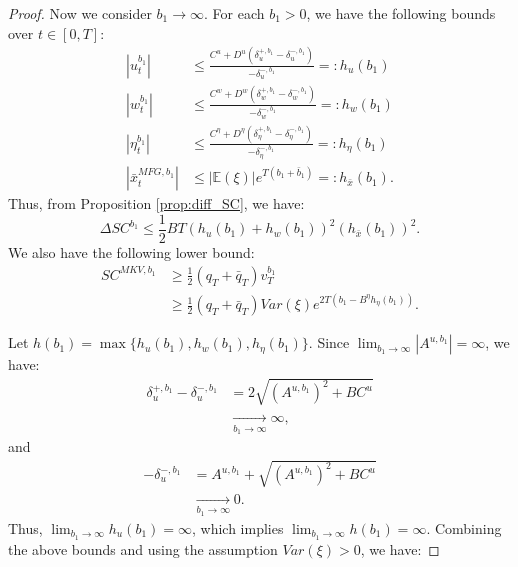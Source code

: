 \documentclass[11pt]{article}
\begin{document}
\begin{proof}
    Now we consider $b_1 \to \infty$. For each $b_1>0$, we have the following bounds over $t\in[0,T]$:
    \begin{equation*}
    \begin{split}
	    \left| u^{b_1}_t\right| &\leq \frac{C^u+D^u(\delta^{+,b_1}_u-\delta^{-,b_1}_u)}{-\delta^{-,b_1}_u}=:h_u(b_1) \\
		\left| w^{b_1}_t\right| &\leq \frac{C^w+D^w(\delta^{+,b_1}_w-\delta^{-,b_1}_w)}{-\delta^{-,b_1}_w}=:h_w(b_1) \\
		\left| \eta^{b_1}_t\right| &\leq \frac{C^{\eta}+D^{\eta}(\delta^{+,b_1}_{\eta}-\delta^{-,b_1}_{\eta})}{-\delta^{-,b_1}_{\eta}}=:h_{\eta}(b_1) \\
		\left| \bar{x}^{MFG,b_1}_t \right| &\leq \left| \mathbb{E}(\xi)\right| e^{T(b_1+\bar{b}_1)}=:h_{\bar{x}}(b_1).
    \end{split}
    \end{equation*}
    Thus, from Proposition \ref{prop:diff_SC}, we have:
    \begin{equation*}
	    \Delta SC^{b_1} \leq \frac{1}{2}BT(h_u(b_1)+h_w(b_1))^2 (h_{\bar{x}}(b_1))^2.
    \end{equation*}
    We also have the following lower bound:
    \begin{equation*}
	\begin{split}
	SC^{MKV,b_1} &\geq \frac{1}{2}(q_T+\bar{q}_T)v^{b_1}_T \\
	& \geq \frac{1}{2}(q_T+\bar{q}_T)Var(\xi)e^{2T(b_1-B^{\eta}h_{\eta}(b_1))}.
	\end{split}
    \end{equation*}
    
    Let $h(b_1)=\max \{h_u(b_1),h_w(b_1),h_{\eta}(b_1) \}$. Since $\lim_{b_1 \to \infty} |A^{u,b_1}|=\infty$, we have:
    \begin{equation*}
    \begin{split}
	    \delta^{+,b_1}_u-\delta^{-,b_1}_u&=2 \sqrt{(A^{u,b_1})^2+BC^u} \\
	    &\xrightarrow[b_1 \to \infty]{}\infty,
    \end{split}
    \end{equation*}
    and
    \begin{equation*}
    \begin{split}
    -\delta^{-,b_1}_u&=A^{u,b_1}+\sqrt{(A^{u,b_1})^2+BC^u} \\
    &\xrightarrow[b_1 \to \infty]{}0.
    \end{split}
    \end{equation*}    
    Thus, $\lim_{b_1 \to \infty}h_u(b_1)=\infty$, which implies $\lim_{b_1 \to \infty}h(b_1)=\infty$. Combining the above bounds and using the assumption $Var(\xi)>0$, we have:
     

\end{proof}
\end{document}
